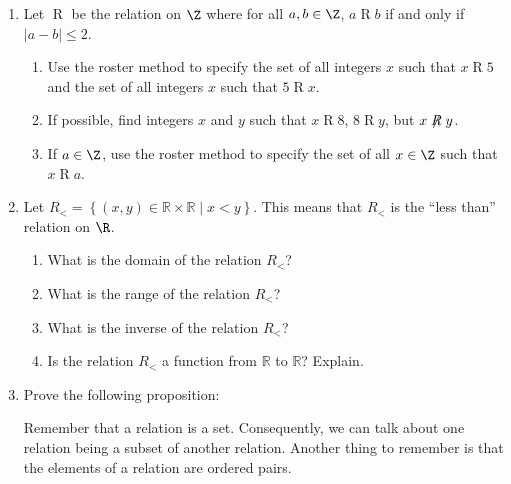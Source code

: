 \begin{enumerate}
\item Let $\mathrel{R}$ be the relation on $\Z$ where for all $a, b \in \Z$, $a \mathrel{R} b$ if and only if $\left| a - b \right| \leq 2$. \label{exer:absvalueless2}

\begin{enumerate}
\yitem Use set builder notation to describe the relation $\mathrel{R}$ as a set of ordered pairs.

\yitem Determine the domain and range of the relation $\mathrel{R}$.

\item Use the roster method to specify the set of all integers $x$ such that $x \mathrel{R} 5$
and the set of all integers $x$ such that $5 \mathrel{R} x$.

\item If possible, find integers $x$ and $y$ such that $x \mathrel{R} 8$, $8 \mathrel{R} y$, but 
$x \mathrel{\not \negthickspace R} y$.

\item If $a \in \Z$, use the roster method to specify the set of all $x \in \Z$ such that 
$x \mathrel{R} a$.

\end{enumerate}

\item Let $R_{  < }  = \left\{ { {\left( {x, y} \right) \in \mathbb{R} \times \mathbb{R} } \mid x < y} \right\}$.  This means that $R_{  < } $ is the ``less than'' relation on  $\R$.
\label{exer:sec71-lessthan}%
\begin{enumerate}
  \item What is the domain of the relation  $R_{  < } $?  

  \item What is the range of the relation  $R_{  < } $?

  \item What is the inverse of the relation  $R_{  < } $?

  \item Is the relation  $R_{  < } $ a function from  $\mathbb{R}$ to  $\mathbb{R}$?  Explain.
\end{enumerate}

\item Prove the following proposition: \label{exer:sec71-inverses}

\noindent
\note  Remember that a relation is a set.  Consequently, we can talk about one relation being a subset of another relation.  Another thing to remember is that the elements of a relation are ordered pairs.

\end{enumerate}



